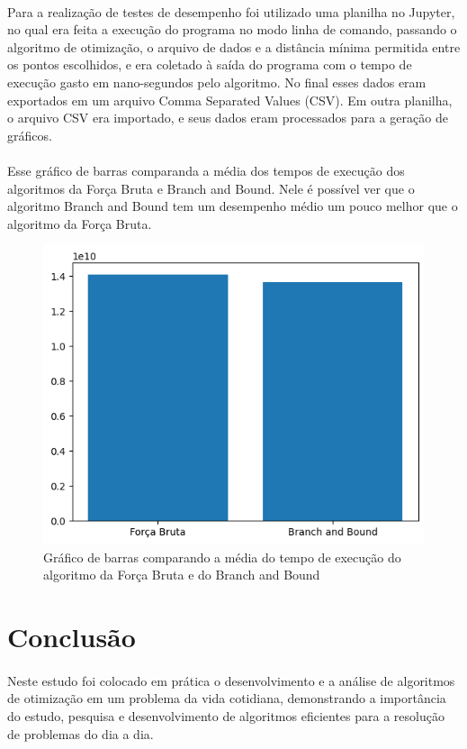 \documentclass[12pt]{article}
\begin{document}
\paragraph{}Para a realização de testes de desempenho foi utilizado uma planilha no Jupyter, no qual era feita a execução do programa no modo linha de comando, passando o algoritmo de otimização, o arquivo de dados e a distância mínima permitida entre os pontos escolhidos, e era coletado à saída do programa com o tempo de execução gasto em nano-segundos pelo algoritmo. No final esses dados eram exportados em um arquivo Comma Separated Values (CSV). Em outra planilha, o arquivo CSV era importado, e seus dados eram processados para a geração de gráficos.

\paragraph{}Esse gráfico de barras comparanda a média dos tempos de execução dos algoritmos da Força Bruta e Branch and Bound. Nele é possível ver que o algoritmo Branch and Bound tem um desempenho médio um pouco melhor que o algoritmo da Força Bruta.

\begin{figure}[H]
    \centering
    \includegraphics{comparacao.png}
    \caption{Gráfico de barras comparando a média do tempo de execução do algoritmo da Força Bruta e do Branch and Bound}
    \label{fig:fig-9}
\end{figure}

\section{Conclusão}

\paragraph{}Neste estudo foi colocado em prática o desenvolvimento e a análise de algoritmos de otimização em um problema da vida cotidiana, demonstrando a importância do estudo, pesquisa e desenvolvimento de algoritmos eficientes para a resolução de problemas do dia a dia.

\nocite{paaII}
\nocite{paaIII}
\nocite{paaIV}



%
\end{document}
